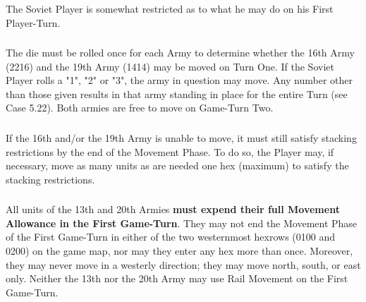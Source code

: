 The Soviet Player is somewhat restricted as to what he may do on his First Player-Turn.

\subsubsection{} The die must be rolled once for each Army to determine whether the 16th Army (2216) and the 19th Army (1414) may be moved on Turn One. If the Soviet Player rolls a "1", "2" or "3", the army in question may move. Any number other than those given results in that army standing in place for the entire Turn (see Case 5.22). Both armies are free to move on Game-Turn Two.

\subsubsection{} If the 16th and/or the 19th Army is unable to move, it must still satisfy stacking restrictions by the end of the Movement Phase. To do so, the Player may, if necessary, move as many units as are needed one hex (maximum) to satisfy the stacking restrictions.

\subsubsection{} All units of the 13th and 20th Armies \textbf{must expend their full Movement Allowance in the First Game-Turn}. They may not end the Movement Phase of the First Game-Turn in either of the two westernmost hexrows (0100 and 0200) on the game map, nor may they enter any hex more than once. Moreover, they may never move in a westerly direction; they may move north, south, or east only. Neither the 13th nor the 20th Army may use Rail Movement on the First Game-Turn.